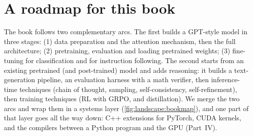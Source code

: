 \section{A roadmap for this book}\label{sec:landscape:roadmap}

The book follows two complementary arcs. The first builds a GPT-style model in
three stages: (1) data preparation and the attention mechanism, then the full architecture; (2)
pretraining, evaluation and loading pretrained weights; (3) fine-tuning for classification and for
instruction following. The second starts from an existing pretrained (and post-trained) model and
adds reasoning: it builds a text-generation pipeline, an evaluation harness with a math verifier, then
inference-time techniques (chain of thought, sampling, self-consistency, self-refinement), then training
techniques (RL with GRPO, and distillation). We merge the two arcs and wrap them in a systems layer
(\cref{fig:landscape:bookmap}), and one part of that layer goes all the way down: C++ extensions for
PyTorch, CUDA kernels, and the compilers between a Python program and the GPU (Part~IV).

